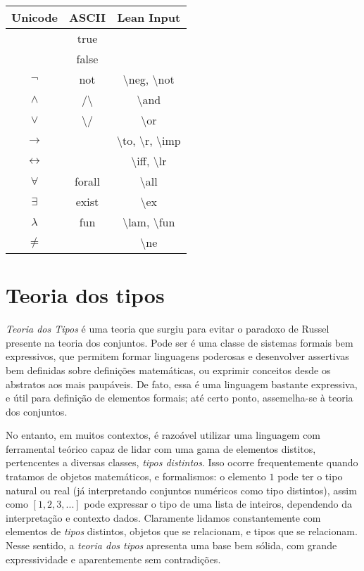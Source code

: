 \begin{table}[ht]
\centering
\begin{tabular}{|c|c|c|}
\hline
Unicode & ASCII & Lean Input\\
\hline
& true &\\
\hline
& false &\\
\hline       
$\neg$ & not & \textbackslash neg, \textbackslash not\\
\hline
$\wedge$ & /\textbackslash & \textbackslash and\\
\hline
$\vee$ & \textbackslash/ & \textbackslash or\\
\hline
$\rightarrow$ &  & \textbackslash to, \textbackslash r, \textbackslash imp\\
\hline
$\leftrightarrow$ &  & \textbackslash iff, \textbackslash lr\\
\hline
$\forall$ & forall & \textbackslash all\\
\hline
$\exists$ & exist & \textbackslash ex\\
\hline
$\lambda$ & fun & \textbackslash lam, \textbackslash fun\\
\hline
$\ne$ &  & \textbackslash ne\\
\hline
\end{tabular}

\end{table}

\section{Teoria dos tipos}
\textit{Teoria dos Tipos} é uma teoria que surgiu para evitar o paradoxo de Russel presente na teoria dos conjuntos. Pode ser é uma classe de sistemas formais bem expressivos, que permitem formar linguagens poderosas e desenvolver assertivas bem definidas sobre definições matemáticas, ou exprimir conceitos desde os abstratos aos mais paupáveis.
De fato, essa é uma linguagem bastante expressiva, e útil para definição de elementos formais; até certo ponto, assemelha-se à teoria dos conjuntos.

No entanto, em muitos contextos, é razoável utilizar uma linguagem com ferramental teórico capaz de lidar com uma gama de elementos distitos, pertencentes a diversas classes, \textit{tipos distintos}.
Isso ocorre frequentemente quando tratamos de objetos matemáticos, e formalismos: o elemento $1$ pode ter o tipo natural ou real (já interpretando conjuntos numéricos como tipo distintos), assim como $[1,2,3, ...]$ pode expressar o tipo de uma lista de inteiros, dependendo da interpretação e contexto dados.
Claramente lidamos constantemente com elementos de \textit{tipos} distintos, objetos que se relacionam, e tipos que se relacionam.
Nesse sentido, a \textit{teoria dos tipos} apresenta uma base bem sólida, com grande expressividade e aparentemente sem contradições.

